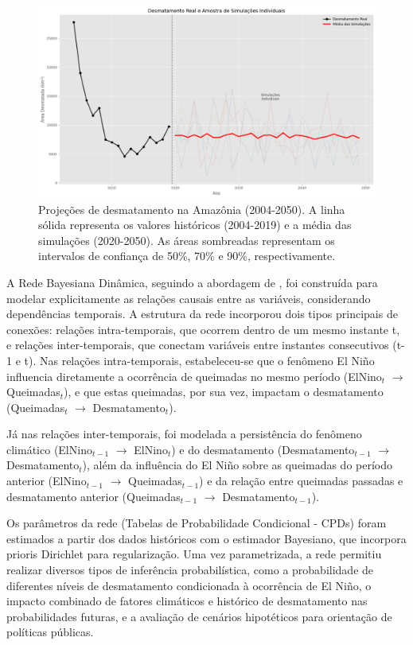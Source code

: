 \documentclass[12pt,a4paper]{article}
\newcommand{\tempvar}[2]{#1$_{#2}$}
\begin{document}
\begin{figure}[htbp]
    \centering
    \includegraphics[width=\textwidth]{img/output.png}
    \caption{Projeções de desmatamento na Amazônia (2004-2050). A linha sólida representa os valores históricos (2004-2019) e a média das simulações (2020-2050). As áreas sombreadas representam os intervalos de confiança de 50\%, 70\% e 90\%, respectivamente.}
    \label{fig:projecoes}
\end{figure}

A Rede Bayesiana Dinâmica, seguindo a abordagem de \citet{dbn}, foi construída para modelar explicitamente as relações causais entre as variáveis, considerando dependências temporais. A estrutura da rede incorporou dois tipos principais de conexões: relações intra-temporais, que ocorrem dentro de um mesmo instante t, e relações inter-temporais, que conectam variáveis entre instantes consecutivos (t-1 e t). Nas relações intra-temporais, estabeleceu-se que o fenômeno El Niño influencia diretamente a ocorrência de queimadas no mesmo período (\tempvar{ElNino}{t} $\to$ \tempvar{Queimadas}{t}), e que estas queimadas, por sua vez, impactam o desmatamento (\tempvar{Queimadas}{t} $\to$ \tempvar{Desmatamento}{t}). 

Já nas relações inter-temporais, foi modelada a persistência do fenômeno climático 
(\tempvar{ElNino}{t-1} $\to$ \tempvar{ElNino}{t}) e do desmatamento 
(\tempvar{Desmatamento}{t-1} $\to$ \tempvar{Desmatamento}{t}), além da 
influência do El Niño sobre as queimadas do período anterior 
(\tempvar{ElNino}{t-1} $\to$ \tempvar{Queimadas}{t-1}) e da relação entre 
queimadas passadas e desmatamento anterior 
(\tempvar{Queimadas}{t-1} $\to$ \tempvar{Desmatamento}{t-1}).

Os parâmetros da rede (Tabelas de Probabilidade Condicional - CPDs) foram estimados a partir dos dados históricos com o estimador Bayesiano, que incorpora prioris Dirichlet para regularização. Uma vez parametrizada, a rede permitiu realizar diversos tipos de inferência probabilística, como a probabilidade de diferentes níveis de desmatamento condicionada à ocorrência de El Niño, o impacto combinado de fatores climáticos e histórico de desmatamento nas probabilidades futuras, e a avaliação de cenários hipotéticos para orientação de políticas públicas.
\end{document}
